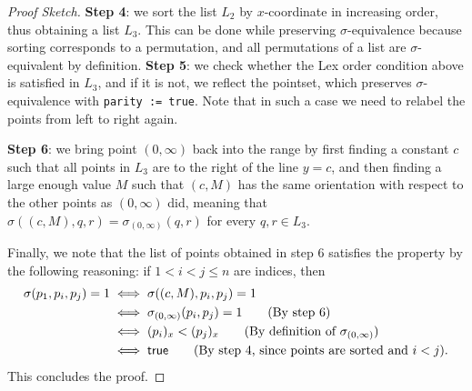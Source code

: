 \begin{proof}[Proof Sketch]
\textbf{Step 4}: we sort the list $L_2$ by $x$-coordinate in increasing order,
thus obtaining a list $L_3$.
This can be done while preserving $\sigma$-equivalence because sorting corresponds to a permutation,
and all permutations of a list are $\sigma$-equivalent by definition.
\textbf{Step 5}: we check whether the \textsf{Lex order} condition above is satisfied in $L_3$,
and if it is not, we reflect the pointset,
which preserves $\sigma$-equivalence with \lstinline|parity := true|.
Note that in such a case we need to relabel the points from left to right again.

\textbf{Step 6}: we bring point $(0, \infty)$ back into the range
by first finding a constant $c$ such that all points in $L_3$ are to the right of the line $y=c$,
and then finding a large enough value $M$ such that $(c, M)$ has the same orientation
with respect to the other points as $(0, \infty)$ did,
meaning that 
\(\sigma((c, M), q, r) = \sigma_{(0, \infty)}(q, r)\) for every $q, r \in L_3$.

Finally, we note that the list of points obtained in step 6
satisfies the  property by the following reasoning:
if $1 < i < j \leq n$ are indices, then 
\begin{align*}
  \sigma(p_1, p_i, p_j) = 1 &\iff \sigma((c, M), p_i, p_j) = 1\\
                            &\iff \sigma_{(0, \infty)}(p_i, p_j) = 1\tag{By step 6}\\
                            &\iff (p_i)_x < (p_j)_x \tag{By definition of $\sigma_{(0, \infty)}$}\\
                            &\iff \textsf{true} \tag{By step 4, since points are sorted and $i < j$}.
\end{align*}
This concludes the proof.
\end{proof}
